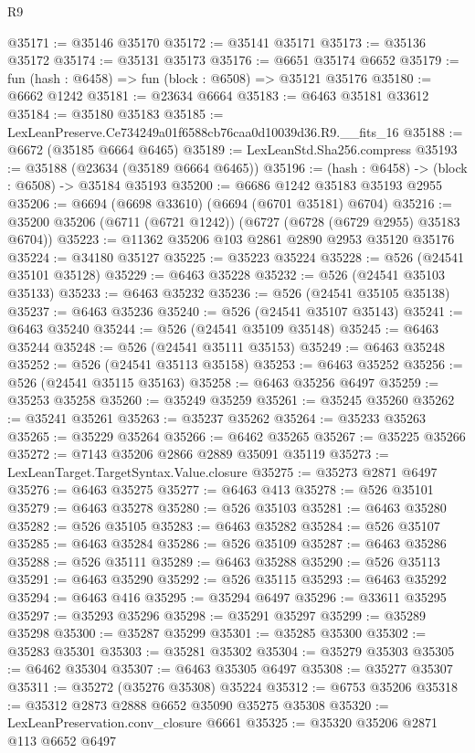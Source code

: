 \begin{lexlean}{R9}
\begin{coremodule}
@35171 := @35146 @35170
@35172 := @35141 @35171
@35173 := @35136 @35172
@35174 := @35131 @35173
@35176 := @6651 @35174 @6652
@35179 := fun (hash : @6458) => fun (block : @6508) => @35121 @35176
@35180 := @6662 @1242
@35181 := @23634 @6664
@35183 := @6463 @35181 @33612
@35184 := @35180 @35183
@35185 := LexLeanPreserve.Ce734249a01f6588cb76caa0d10039d36.R9.__fits_16
@35188 := @6672 (@35185 @6664 @6465)
@35189 := LexLeanStd.Sha256.compress
@35193 := @35188 (@23634 (@35189 @6664 @6465))
@35196 := (hash : @6458) -> (block : @6508) -> @35184 @35193
@35200 := @6686 @1242 @35183 @35193 @2955
@35206 := @6694 (@6698 @33610) (@6694 (@6701 @35181) @6704)
@35216 := @35200 @35206 (@6711 (@6721 @1242)) (@6727 (@6728 (@6729 @2955) @35183 @6704))
@35223 := @11362 @35206 @103 @2861 @2890 @2953 @35120 @35176
@35224 := @34180 @35127
@35225 := @35223 @35224
@35228 := @526 (@24541 @35101 @35128)
@35229 := @6463 @35228
@35232 := @526 (@24541 @35103 @35133)
@35233 := @6463 @35232
@35236 := @526 (@24541 @35105 @35138)
@35237 := @6463 @35236
@35240 := @526 (@24541 @35107 @35143)
@35241 := @6463 @35240
@35244 := @526 (@24541 @35109 @35148)
@35245 := @6463 @35244
@35248 := @526 (@24541 @35111 @35153)
@35249 := @6463 @35248
@35252 := @526 (@24541 @35113 @35158)
@35253 := @6463 @35252
@35256 := @526 (@24541 @35115 @35163)
@35258 := @6463 @35256 @6497
@35259 := @35253 @35258
@35260 := @35249 @35259
@35261 := @35245 @35260
@35262 := @35241 @35261
@35263 := @35237 @35262
@35264 := @35233 @35263
@35265 := @35229 @35264
@35266 := @6462 @35265
@35267 := @35225 @35266
@35272 := @7143 @35206 @2866 @2889 @35091 @35119
@35273 := LexLeanTarget.TargetSyntax.Value.closure
@35275 := @35273 @2871 @6497
@35276 := @6463 @35275
@35277 := @6463 @413
@35278 := @526 @35101
@35279 := @6463 @35278
@35280 := @526 @35103
@35281 := @6463 @35280
@35282 := @526 @35105
@35283 := @6463 @35282
@35284 := @526 @35107
@35285 := @6463 @35284
@35286 := @526 @35109
@35287 := @6463 @35286
@35288 := @526 @35111
@35289 := @6463 @35288
@35290 := @526 @35113
@35291 := @6463 @35290
@35292 := @526 @35115
@35293 := @6463 @35292
@35294 := @6463 @416
@35295 := @35294 @6497
@35296 := @33611 @35295
@35297 := @35293 @35296
@35298 := @35291 @35297
@35299 := @35289 @35298
@35300 := @35287 @35299
@35301 := @35285 @35300
@35302 := @35283 @35301
@35303 := @35281 @35302
@35304 := @35279 @35303
@35305 := @6462 @35304
@35307 := @6463 @35305 @6497
@35308 := @35277 @35307
@35311 := @35272 (@35276 @35308) @35224
@35312 := @6753 @35206
@35318 := @35312 @2873 @2888 @6652 @35090 @35275 @35308
@35320 := LexLeanPreservation.conv_closure @6661
@35325 := @35320 @35206 @2871 @113 @6652 @6497

\end{coremodule}
\end{lexlean}

